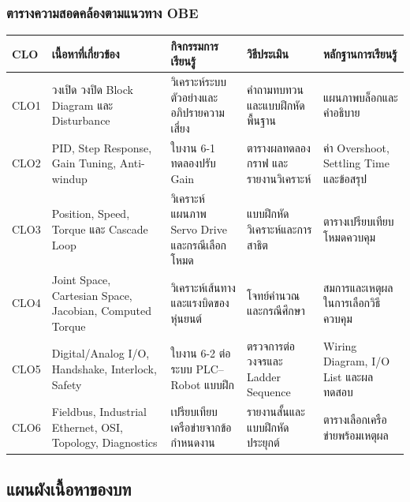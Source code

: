 \newpage

\subsubsection{ตารางความสอดคล้องตามแนวทาง OBE}

\begin{table}[htbp]
    \centering
    \small
    \begin{tabularx}{\textwidth}{@{}L{0.09\textwidth} X X X X@{}}
        \hline
        \textbf{CLO} & \textbf{เนื้อหาที่เกี่ยวข้อง} & \textbf{กิจกรรมการเรียนรู้} & \textbf{วิธีประเมิน} & \textbf{หลักฐานการเรียนรู้} \\
        \hline
        CLO1 & วงเปิด วงปิด Block Diagram และ Disturbance & วิเคราะห์ระบบตัวอย่างและอภิปรายความเสี่ยง & คำถามทบทวนและแบบฝึกหัดพื้นฐาน & แผนภาพบล็อกและคำอธิบาย \\
        CLO2 & PID, Step Response, Gain Tuning, Anti-windup & ใบงาน 6-1 ทดลองปรับ Gain & ตารางผลทดลอง กราฟ และรายงานวิเคราะห์ & ค่า Overshoot, Settling Time และข้อสรุป \\
        CLO3 & Position, Speed, Torque และ Cascade Loop & วิเคราะห์แผนภาพ Servo Drive และกรณีเลือกโหมด & แบบฝึกหัดวิเคราะห์และการสาธิต & ตารางเปรียบเทียบโหมดควบคุม \\
        CLO4 & Joint Space, Cartesian Space, Jacobian, Computed Torque & วิเคราะห์เส้นทางและแรงบิดของหุ่นยนต์ & โจทย์คำนวณและกรณีศึกษา & สมการและเหตุผลในการเลือกวิธีควบคุม \\
        CLO5 & Digital/Analog I/O, Handshake, Interlock, Safety & ใบงาน 6-2 ต่อระบบ PLC–Robot แบบฝึก & ตรวจการต่อวงจรและ Ladder Sequence & Wiring Diagram, I/O List และผลทดสอบ \\
        CLO6 & Fieldbus, Industrial Ethernet, OSI, Topology, Diagnostics & เปรียบเทียบเครือข่ายจากข้อกำหนดงาน & รายงานสั้นและแบบฝึกหัดประยุกต์ & ตารางเลือกเครือข่ายพร้อมเหตุผล \\
        \hline
    \end{tabularx}
\end{table}

\subsection{แผนผังเนื้อหาของบท}

